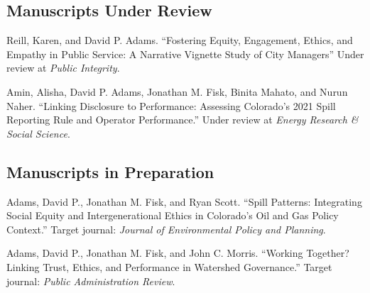 \documentclass[11pt,letterpaper]{article}
\renewenvironment{itemize}{
  \begin{list}{}{
    \setlength{\leftmargin}{1.5em}
    \setlength{\itemsep}{0.25em}
    \setlength{\parskip}{0pt}
    \setlength{\parsep}{0.25em}
  }
}{
  \end{list}
}
\begin{document}
\subsection*{Manuscripts Under Review}
\begin{itemize}\leftmargin=2pt\itemindent=-15pt\leftmargin=2pt\itemindent=-15pt

    \item Reill, Karen, and David P. Adams. ``Fostering Equity, Engagement, Ethics, and Empathy in Public Service: A Narrative Vignette Study of City Managers'' Under review at \emph{Public Integrity}.
    \item Amin, Alisha, David P. Adams, Jonathan M. Fisk, Binita Mahato, and Nurun Naher. ``Linking Disclosure to Performance: Assessing Colorado's 2021 Spill Reporting Rule and Operator Performance.'' Under review at \emph{Energy Research \& Social Science}.
\end{itemize}

\subsection*{Manuscripts in Preparation}
\begin{itemize} \leftmargin=2pt\itemindent=-15pt\leftmargin=2pt\itemindent=-15pt
    \item Adams, David P., Jonathan M. Fisk, and Ryan Scott. ``Spill Patterns: Integrating Social Equity and Intergenerational Ethics in Colorado's Oil and Gas Policy Context.'' Target journal: \emph{Journal of Environmental Policy and Planning}.

    \item Adams, David P., Jonathan M. Fisk, and John C. Morris. ``Working Together? Linking Trust, Ethics, and Performance in Watershed Governance.'' Target journal: \emph{Public Administration Review}.
\end{itemize}
\end{document}
